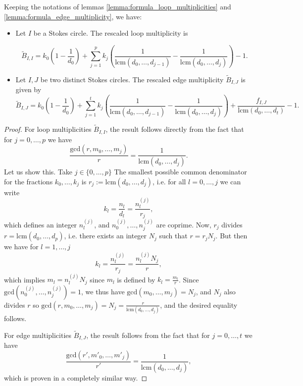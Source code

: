 \documentclass[11pt,a4paper]{amsart}
\numberwithin{equation}{section}
\begin{document}
\begin{lemma} Keeping the notations of lemmas \ref{lemma:formula_loop_multiplicities} and \ref{lemma:formula_edge_multiplicity}, we have:
\begin{itemize} 
\item Let $I$ be a Stokes circle. The rescaled loop multiplicity is 

\begin{equation}
\widetilde B_{I,I}=k_0(1-\frac{1}{d_0})+ \sum_{j=1}^p  k_j\left(\frac{1}{\mathrm{lcm}(d_0, \dots, d_{j-1})}-\frac{1}{\mathrm{lcm}(d_0, \dots, d_{j})}\right)-1.
\end{equation}
\item Let $I,J$ be two distinct Stokes circles. The rescaled edge multiplicity $\widetilde B_{I,J}$ is given by
\begin{equation}
\widetilde B_{I,J}=k_0(1-\frac{1}{d_0})+ \sum_{j=1}^t k_j\left(\frac{1}{\mathrm{lcm}(d_0, \dots, d_{j-1})}-\frac{1}{\mathrm{lcm}(d_0, \dots, d_{j})}\right)+\frac{f_{I,J}}{\mathrm{lcm}(d_0, \dots, d_{t})}-1.
\end{equation}
\end{itemize}
\end{lemma}

\begin{proof}
For loop multiplicities $\widetilde{B}_{I,I}$, the result follows directly from the fact that for $j=0, \dots, p$ we have
\[
\frac{\mathrm{gcd}(r, m_0, \dots,m_j)}{r}=\frac{1}{\mathrm{lcm}(d_0, \dots, d_j)}.
\]
Let us show this. Take $j\in \{0, \dots,p\}$ 
The smallest possible common denominator for the fractions $k_0,\dots,k_j$ is $r_j:=\mathrm{lcm}(d_0, \dots, d_j)$, i.e. for all $l=0, \dots, j$ we can write
\[
k_l=\frac{n_l}{d_l}=\frac{n_l^{(j)}}{r_j},
\]
which defines an integer $n_l^{(j)}$, and $n_0^{(j)}, \dots, n_j^{(j)}$ are coprime. Now, $r_j$ divides $r=\mathrm{lcm}(d_0, \dots, d_p)$, i.e. there exists an integer $N_j$ such that $r=r_j N_j$. But then we have for $l=1, \dots, j$
\[
k_l=\frac{n_l^{(j)}}{r_j}=\frac{n_l^{(j)}N_j}{r},
\]
which implies $m_l=n_l^{(j)}N_j$ since $m_l$ is defined by $k_l=\frac{m_l}{r}$. Since $\mathrm{gcd}(n_0^{(j)}, \dots, n_j^{(j)})=1$, we thus have $\mathrm{gcd}(m_0,\dots, m_j)=N_j$, and $N_j$ also divides $r$ so $\mathrm{gcd}(r,m_0,\dots, m_j)=N_j=\frac{r}{\mathrm{lcm}(d_0, \dots, d_j)}$, and the desired equality follows. 

For edge multiplicities $\widetilde B_{I,J}$, the result follows from the fact that for $j=0, \dots, t$ we have
\[
\frac{\mathrm{gcd}(r', m'_0, \dots,m'_j)}{r'}=\frac{1}{\mathrm{lcm}(d_0, \dots, d_j)},
\]
which is proven in a completely similar way. 
\end{proof}
\end{document}
